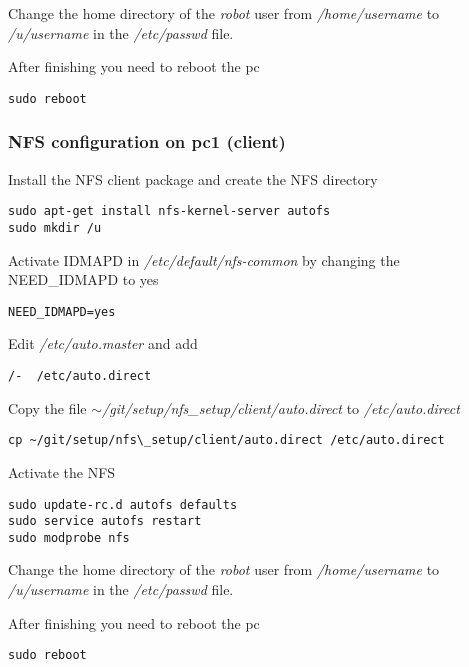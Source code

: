 Change the home directory of the \textit{robot} user from \textit{/home/username} to \textit{/u/username} in the \textit{/etc/passwd} file.

After finishing you need to reboot the pc

\begin{lstlisting}
sudo reboot
\end{lstlisting}

\subsubsection{NFS configuration on pc1 (client)}
Install the NFS client package and create the NFS directory

\begin{lstlisting}
sudo apt-get install nfs-kernel-server autofs
sudo mkdir /u
\end{lstlisting}

Activate IDMAPD in \textit{/etc/default/nfs-common} by changing the NEED\_IDMAPD to yes

\begin{lstlisting} 
NEED_IDMAPD=yes
\end{lstlisting}

Edit \textit{/etc/auto.master} and add

\begin{lstlisting}
/-	/etc/auto.direct
\end{lstlisting}

Copy the file \textit{$\sim$/git/setup/nfs\_setup/client/auto.direct} to \textit{/etc/auto.direct}

\begin{lstlisting}
cp ~/git/setup/nfs\_setup/client/auto.direct /etc/auto.direct
\end{lstlisting}

Activate the NFS

\begin{lstlisting}
sudo update-rc.d autofs defaults
sudo service autofs restart
sudo modprobe nfs
\end{lstlisting}

Change the home directory of the \textit{robot} user from \textit{/home/username} to \textit{/u/username} in the \textit{/etc/passwd} file.

After finishing you need to reboot the pc

\begin{lstlisting} 
sudo reboot
\end{lstlisting}

